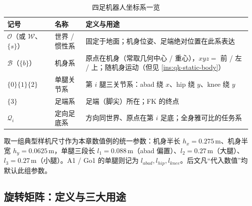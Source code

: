 \begin{table}[H]\centering\small
\caption{四足机器人坐标系一览}
\label{tab:qk-frames}
\begin{tabular}{p{} p{} p{}}
\toprule
记号 & 名称 & 定义与用途 \\
\midrule
$\mathcal{O}$（或 $\mathcal{W}$、$\{s\}$） & 世界 / 惯性系 & 固定于地面；机身位姿、足端绝对位置在此系表达 \\
$\mathcal{B}$（$\{b\}$） & 机身系 & 原点在机身（常取几何中心 / 重心），$xyz=$ 前 / 左 / 上；随机身运动（但见 \cref{ins:qk-static-body}）\\
$\{0\}\{1\}\{2\}$ & 单腿关节系 & 第 $i$ 腿三关节系：abad 绕 $x$、hip 绕 $y$、knee 绕 $y$ \\
$\{3\}$ & 足端系 & 足端（脚尖）所在；FK 的终点 \\
$\mathcal{Q}_i$ & 定向足底系 & 方向同世界、原点在第 $i$ 足底；全身雅可比的任务系 \\
\bottomrule
\end{tabular}
\end{table}

\begin{example}\label{exam:qk-dims}
取一组典型样机尺寸作为本章数值例的统一参数\cite{yu2021quadruped}：机身半长 $h_x=0.275\,\mathrm{m}$、机身半宽 $h_y=0.0625\,\mathrm{m}$，单腿三段长 $l_1=0.088\,\mathrm{m}$（abad 偏置）、$l_2=0.27\,\mathrm{m}$（大腿）、$l_3=0.27\,\mathrm{m}$（小腿）。A1 / Go1 的单腿则记为 $l_{abad},l_{hip},l_{knee}$\cite{unitree2023quadruped}。后文凡“代入数值”均默认此组参数。
\end{example}

\subsection{旋转矩阵：定义与三大用途}
\label{subsec:qk-rotation}

